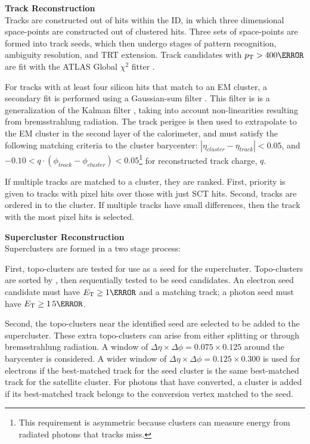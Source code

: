 \noindent\textbf{Track Reconstruction}\\ %
\indent Tracks are constructed out of hits within the \gls{ID}, in which three dimensional space-points are constructed out of clustered hits. Three sets of space-points are formed into track seeds, which then undergo stages of pattern recognition, ambiguity resolution, and \gls{TRT} extension. Track candidates with $\pt > \unit{400}{\MeV}$ are fit with the ATLAS Global $\chi^2$ fitter \cite{chi-2-fitter}.

For tracks with at least four silicon hits that match to an \gls{EM} cluster, a secondary fit is performed using a Gaussian-sum filter \cite{gaussian-sum-filter}. This filter is is a generalization of the Kalman filter \cite{kalman-filter}, taking into account non-linearities resulting from bremsstrahlung radiation. The track perigee is then used to extrapolate to the \gls{EM} cluster in the second layer of the calorimeter, and must satisfy the following matching criteria to the cluster barycenter: $|\eta_{cluster} - \eta_{track}| < 0.05$, and $-0.10 < q \cdot (\phi_{track}-\phi_{cluster}) < 0.05$\footnote{This requirement is asymmetric because clusters can measure energy from radiated photons that tracks miss.} for reconstructed track charge, $q$.

If multiple tracks are matched to a cluster, they are ranked. First, priority is given to tracks with pixel hits over those with just \gls{SCT} hits. Second, tracks are ordered in \Dr to the cluster. If multiple tracks have small \Dr differences, then the track with the most pixel hits is selected. 


\noindent\textbf{Supercluster Reconstruction}\\ 
\indent Superclusters are formed in a two stage process:

First, topo-clusters are tested for use as a seed for the supercluster. Topo-clusters are sorted by \et, then sequentially tested to be seed candidates. An electron seed candidate must have $\et \geq \unit{1}{\GeV}$ and a matching track; a photon seed must have $\et \geq \unit{1.5}{\GeV}$. 

Second, the topo-clusters near the identified seed are selected to be added to the supercluster. These extra topo-clusters can arise from either splitting or through bremsstrahlung radiation. A window of $\Delta \eta \times \Delta \phi = 0.075 \times 0.125$ around the barycenter is considered. A wider window of $\Delta \eta \times \Delta \phi = 0.125 \times 0.300$ is used for electrons if the best-matched track for the seed cluster is the same best-matched track for the satellite cluster. For photons that have converted, a cluster is added if its best-matched track belongs to the conversion vertex matched to the seed.

